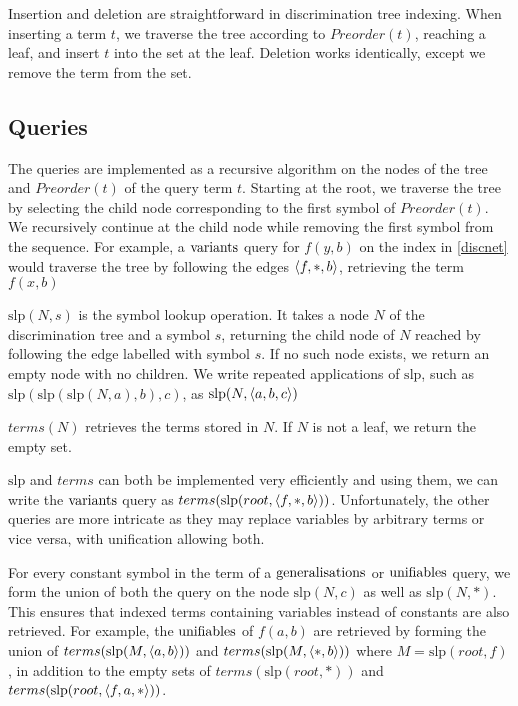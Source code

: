 Insertion and deletion are straightforward in discrimination tree indexing. When inserting a term $t$, we traverse the tree according to $Preorder(t)$, reaching a leaf, and insert $t$ into the set at the leaf. Deletion works identically, except we remove the term from the set.

\subsection{Queries}
The queries are implemented as a recursive algorithm on the nodes of the tree and $Preorder(t)$ of the query term $t$. Starting at the root, we traverse the tree by selecting the child node corresponding to the first symbol of $Preorder(t)$. We recursively continue at the child node while removing the first symbol from the sequence. For example, a $\mathrm{variants}$ query for $f(y,b)$ on the index in \cref{discnet} would traverse the tree by following the edges $\langle f,*,b \rangle$, retrieving the term $f(x,b)$

\newcommand{\slp}{\mathrm{slp}}
\begin{defn}
  $\slp(N,s)$ is the symbol lookup operation. It takes a node $N$ of the discrimination tree and a symbol $s$, returning the child node of $N$ reached by following the edge labelled with symbol $s$. If no such node exists, we return an empty node with no children. We write repeated applications of $\slp$, such as $\slp(\slp(\slp(N,a),b),c)$, as $\slp(N, \ang{a,b,c})$
\end{defn}
\begin{defn}
  $terms(N)$ retrieves the terms stored in $N$. If $N$ is not a leaf, we return the empty set.
\end{defn}


$\slp$ and $terms$ can both be implemented very efficiently and using them, we can write the $\mathrm{variants}$ query as $terms(\slp(root,\ang{f,*,b}))$. Unfortunately, the other queries are more intricate as they may replace variables by arbitrary terms or vice versa, with unification allowing both.

For every constant symbol in the term of a $\mathrm{generalisations}$ or $\mathrm{unifiables}$ query, we form the union of both the query on the node $\slp(N,c)$ as well as $\slp(N,*)$. This ensures that indexed terms containing variables instead of constants are also retrieved. For example, the $\mathrm{unifiables}$ of $f(a,b)$ are retrieved by forming the union of $terms(\slp(M,\ang{a,b}))$ and $terms(\slp(M,\ang{*,b}))$ where $M = \slp(root,f)$, in addition to the empty sets of $terms(\slp(root,*))$ and $terms(\slp(root,\ang{f,a,*}))$.

